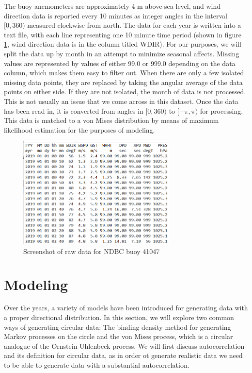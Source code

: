 \documentclass[12pt]{article}
\numberwithin{equation}{section}
\numberwithin{figure}{section}
\begin{document}
The buoy anemometers are approximately 4 m above sea level, and wind direction data is reported every 10 minutes as integer angles in the interval $[0,360)$ measured clockwise from north. The data for each year is written into a text file, with each line representing one 10 minute time period (shown in figure \ref{fig:41047}, wind direction data is in the column titled WDIR). For our purposes, we will split the data up by month in an attempt to minimize seasonal affects. Missing values are represented by values of either 99.0 or 999.0 depending on the data column, which makes them easy to filter out. When there are only a few isolated missing data points, they are replaced by taking the angular average of the data points on either side. If they are not isolated, the month of data is not processed. This is not usually an issue that we come across in this dataset. Once the data has been read in, it is converted from angles in $[0,360)$ to $[-\pi,\pi)$ for processing. This data is matched to a von Mises distribution by means of maximum likelihood estimation for the purposes of modeling. 

\begin{figure}[h]
\centering
\includegraphics[width=80mm]{New Folder/ndbc screeenshot.png}
\caption{Screenshot of raw data for NDBC buoy 41047}
\label{fig:41047}
\end{figure}


\section{Modeling}

Over the years, a variety of models have been introduced for generating data with a proper directional distribution. In this section, we will explore two common ways of generating circular data: The binding density method for generating Markov processes on the circle and the von Mises process, which is a circular analogue of the Ornstein-Uhlenbeck process. We will first discuss autocorrelation and its definition for circular data, as in order ot generate realistic data we need to be able to generate data with a substantial autocorrelation. 
\end{document}
